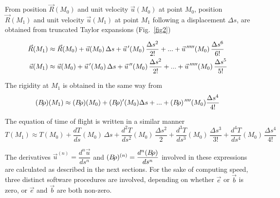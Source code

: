 \noindent From position $ \vec  R(M_0) $ and unit velocity $ \vec  u(M_0) $ at
point $ M_0 $, position $ \vec  R(M_1) $ and unit velocity $ \vec  u(M_1) $ 
at point $ M_1 $ following a 
displacement  $ \Delta s $, are obtained from truncated Taylor expansions (Fig.~\ref{fig2})  

\begin{equation}
\begin{aligned}
\vec  R(M_1)  &  \approx  \vec  R(M_0) + \vec  u(M_0)\, \Delta s+ \vec  u^{\,\prime} (M_0)\,
	\dfrac{\Delta s^2 }{2!}  +  ...+ \vec  u^{\,\prime\prime\prime\prime\prime} (M_0)\,
	\dfrac{\Delta s^6 }{6!} \\
\vec  u(M_1) & \approx  \vec u(M_0)  + \vec  u^{\,\prime} (M_0)\,\Delta s  + \vec  u^{\,\prime\prime} (M_0)\,
	\dfrac{\Delta s^2 }{2!}  +   ...+ \vec  u^{\,\prime\prime\prime\prime\prime} (M_0)\,
	\dfrac{\Delta s^5 }{5!} 
\end{aligned}\label{eq2-2-4}
\end{equation}

\noindent The rigidity at $ M_1 $ is obtained in the same way from
\begin{equation}
 (B\!\rho )(M_1) \approx (B\!\rho )(M_0)+(B\!\rho )^\prime (M_0)\Delta s+...+
	(B\!\rho)^{\,\prime\prime\prime\prime} (M_0) \frac{\Delta s^4 }{4!}   	\label{eq2-2-5}
\end{equation}

\noindent The equation of time of flight is written in a similar manner 
\begin{equation}
 T(M_1) \approx   T(M_0) +   \frac{dT}{ds}(M_0)\, \Delta s+ \frac{d^2T}{ds^2} (M_0)\,\frac{\Delta s^2}{2} + 
     \frac{d^3T}{ds^3} (M_0)\,\frac{\Delta s^3}{3!} + \frac{d^4T}{ds^4} (M_0)\,\frac{\Delta s^4}{4!} 	\label{eq2-2-Time}
\end{equation}


\noindent The derivatives $\vec  u^{(n)} = \dfrac{d^n\vec  u}{ds^n}$ and 
$ (B\!\rho )^{(n)} = \dfrac{d^n(B\!\rho )}{ds^n} $
involved in these expressions are calculated as described in the next sections. 
For the sake of computing speed, three distinct software procedures are involved, depending on 
whether $\vec e$ or $\vec  b$ is zero, or $ \vec e$ and $ \vec b$ are 
both non-zero.

